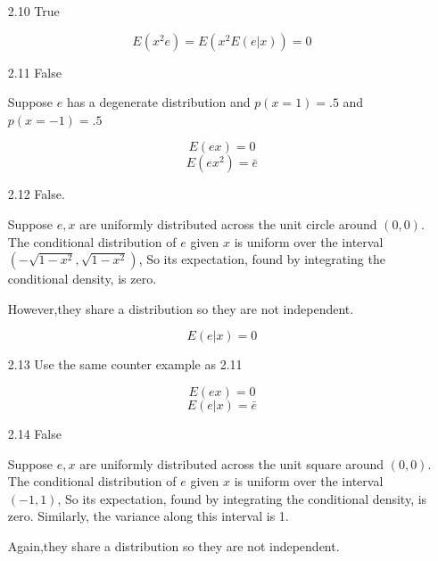 \documentclass{article}
\begin{document}
\begin{enumerate}
    \item[2.10] True

    $$E(x^2e) = E(x^2 E(e|x) ) = 0$$

    \item[2.11] False

    Suppose $e$ has a degenerate distribution and $p(x=1) = .5$ and $p(x=-1) = .5$

    $$E(ex) = 0$$
    $$E(ex^2) = \bar{e} $$

    \item[2.12] False.

    Suppose $e,x$ are uniformly distributed across the unit circle around $(0,0)$. The conditional distribution of $e$ given $x$ is uniform over the interval $(-\sqrt{1-x^2},\sqrt{1-x^2})$, So its expectation, found by integrating the conditional density, is zero.

    However,they share a distribution so they are not independent.


    $$E(e|x) = 0$$

    \item[2.13] Use the same counter example as 2.11

    $$E(ex) = 0$$
    $$E(e|x) = \bar{e} $$


    \item[2.14] False

    Suppose $e,x$ are uniformly distributed across the unit square around $(0,0)$. The conditional distribution of $e$ given $x$ is uniform over the interval $(-1,1)$, So its expectation, found by integrating the conditional density, is zero. Similarly, the variance along this interval is 1.

    Again,they share a distribution so they are not independent.

\end{enumerate}
\end{document}
